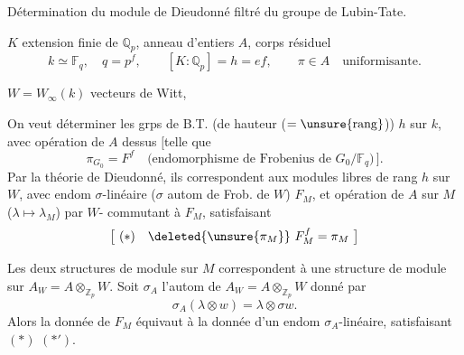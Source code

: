 
Détermination du module de Dieudonné filtré du groupe de Lubin-Tate.

$K$ extension finie de $\mathbb Q_p$, anneau d'entiers $A$, corps résiduel
\[
k\simeq\mathbb F_q,\quad q=p^f,\qquad [K:\mathbb Q_p]=h=ef,\qquad \pi\in A\quad\text{uniformisante}.
\]

$W=W_\infty(k)$ vecteurs de Witt,

On veut déterminer  les grps de B.T.  (de hauteur ($=\unsure{\mathrm{rang}}$)) $h$ sur  $k$, avec opération de $A$ dessus $[$telle que
\[
\pi_{G_0}=F^f\quad\text{(endomorphisme de Frobenius de $G_0/\mathbb F_q$)}\,].
\]
Par la théorie de Dieudonné, ils correspondent aux modules libres  de rang $h$ sur $W$, avec endom $\sigma$-linéaire ($\sigma$ autom de Frob. de $W$) $F_M$, et opération de $A$ sur $M$ ($\lambda\mapsto\lambda_M$) par $W$- commutant à $F_M$, satisfaisant
\[
\bigl[\ (*)\quad\deleted{\unsure{\pi_M}}\ F_M^f=\pi_M\ \bigr]
\]

Les deux structures de module sur $M$ correspondent à une structure de module sur $A_W=A\otimes_{\mathbb Z_p}W$. Soit  $\sigma_A$ l'autom de $A_W=A\otimes_{\mathbb Z_p}W$ donné par
\[
\sigma_A(\lambda\otimes w)=\lambda\otimes\sigma w.
\]
Alors la donnée de $F_M$ équivaut à la donnée d'un endom $\sigma_A$-linéaire, satisfaisant $(*)$ $(*')$.
